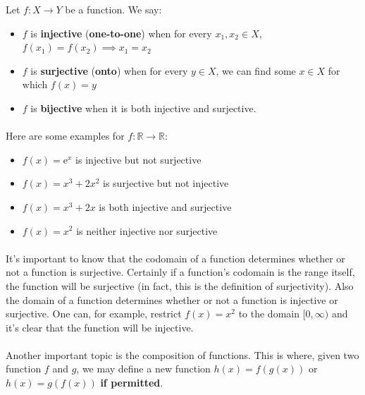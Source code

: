 \documentclass[12pt, a4paper, titlepage, twoside]{article}
\newcommand*{\R}{\mathbb{R}}
\newcommand*{\e}{\textrm{e}}
\begin{document}
	\begin{kp}
		Let $f : X \to Y$ be a function. We say:
		\begin{itemize}
			\item $f$ is \textbf{injective} (\textbf{one-to-one}) when for every $x_1, x_2 \in X$, $f(x_1) = f(x_2) \implies x_1 = x_2$
			\item $f$ is \textbf{surjective} (\textbf{onto}) when for every $y \in X$, we can find some $x \in X$ for which $f(x) = y$
			\item $f$ is \textbf{bijective} when it is both injective and surjective.
		\end{itemize}
	\end{kp}
	
	\paragraph{}
	Here are some examples for $f : \R \to \R$:
	
	\begin{itemize}
		\item $f(x) = \e^x$ is injective but not surjective
		\item $f(x) = x^3 + 2x^2$ is surjective but not injective
		\item $f(x) = x^3 + 2x$ is both injective and surjective
		\item $f(x) = x^2$ is neither injective nor surjective
	\end{itemize}
	
	\paragraph{}
	It's important to know that the codomain of a function determines whether or not a function is surjective. Certainly if a function's codomain
	is the range itself, the function will be surjective (in fact, this is the definition of surjectivity). Also the domain of a function determines whether 
	or not a function is injective or surjective. One can, for example, restrict $f(x) = x^2$ to the domain $[0,\infty)$ and it's clear that the function
	will be injective.
	
	\paragraph{}
	Another important topic is the composition of functions. This is where, given two function $f$ and $g$, we may define a new function
	$h(x) = f(g(x))$ or $h(x) = g(f(x))$ \textbf{if permitted}.\\
	
\end{document}

